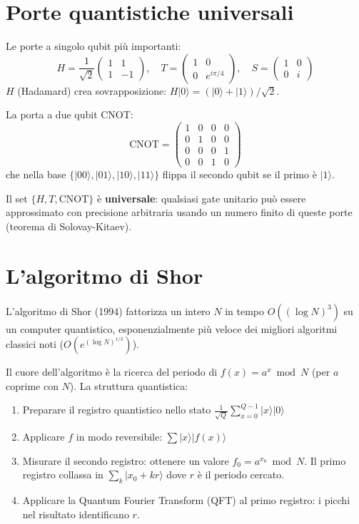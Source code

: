 \documentclass[11.5pt,a4paper,openany]{book}
\theoremstyle{remark}
\begin{document}
\section{Porte quantistiche universali}

Le porte a singolo qubit più importanti:
\[
H = \frac{1}{\sqrt{2}}\begin{pmatrix}1&1\\1&-1\end{pmatrix}, \quad
T = \begin{pmatrix}1&0\\0&e^{i\pi/4}\end{pmatrix}, \quad
S = \begin{pmatrix}1&0\\0&i\end{pmatrix}
\]
$H$ (Hadamard) crea sovrapposizione: $H|0\rangle = (|0\rangle + |1\rangle)/\sqrt{2}$.

La porta a due qubit CNOT:
\[
\text{CNOT} = \begin{pmatrix}1&0&0&0\\0&1&0&0\\0&0&0&1\\0&0&1&0\end{pmatrix}
\]
che nella base $\{|00\rangle, |01\rangle, |10\rangle, |11\rangle\}$ flippa il secondo qubit se il primo è $|1\rangle$.

Il set $\{H, T, \text{CNOT}\}$ è \textbf{universale}: qualsiasi gate unitario può essere approssimato con precisione arbitraria usando un numero finito di queste porte (teorema di Solovay-Kitaev).

\section{L'algoritmo di Shor}

L'algoritmo di Shor (1994) fattorizza un intero $N$ in tempo $O((\log N)^3)$ su un computer quantistico, esponenzialmente più veloce dei migliori algoritmi classici noti ($O(e^{(\log N)^{1/3}})$).

Il cuore dell'algoritmo è la ricerca del periodo di $f(x) = a^x \bmod N$ (per $a$ coprime con $N$). La struttura quantistica:
\begin{enumerate}
\item Preparare il registro quantistico nello stato $\frac{1}{\sqrt{Q}}\sum_{x=0}^{Q-1}|x\rangle|0\rangle$
\item Applicare $f$ in modo reversibile: $\sum|x\rangle|f(x)\rangle$
\item Misurare il secondo registro: ottenere un valore $f_0 = a^{x_0}\bmod N$. Il primo registro collassa in $\sum_{k}|x_0 + kr\rangle$ dove $r$ è il periodo cercato.
\item Applicare la Quantum Fourier Transform (QFT) al primo registro: i picchi nel risultato identificano $r$.
\end{enumerate}
\end{document}
